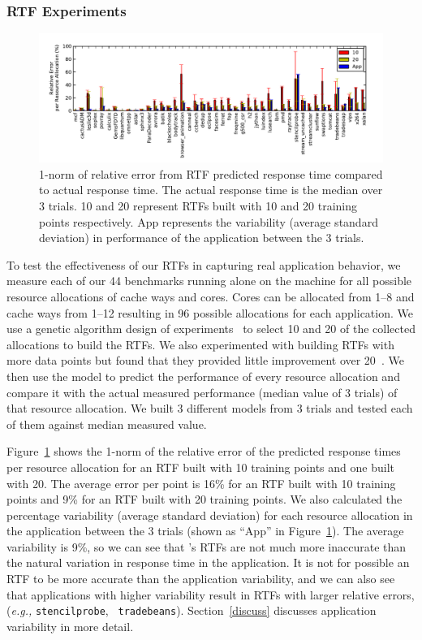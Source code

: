 \subsubsection{RTF Experiments}
\begin{figure}[!t]
	\begin{center}	
		\includegraphics[bb=0 0 576 216,width=\textwidth]{Figures/model_accuracy.pdf}
		\caption{1-norm of relative error from RTF predicted response time compared to actual response time.  The actual response time is the median over 3 trials. 10 and 20 represent RTFs built with 10 and 20 training points respectively.  App represents the variability (average standard deviation) in performance of the application between the 3 trials.}
		\label{model_accuracy}
	\end{center}
\end{figure}
To test the effectiveness of our RTFs in capturing real application behavior, we measure each of our 44 benchmarks running alone on the machine for all possible resource allocations of cache ways and cores.  Cores can be allocated from 1--8 and cache ways from 1--12 resulting in 96 possible allocations for each application.   We use a genetic algorithm design of experiments~\cite{bates-aes03} to select 10 and 20 of the collected allocations to build the RTFs.  We also experimented with building RTFs with more data points but found that they provided little improvement over 20~\cite{pacora_tr}.  We then use the model to predict the performance of every resource allocation and compare it with the actual measured performance (median value of 3 trials) of that resource allocation.  We built 3 different models from 3 trials and tested each of them against median measured value.

Figure~\ref{model_accuracy} shows the 1-norm of the relative error of the predicted response times per resource allocation for an RTF built with 10 training points and one built with 20.  The average error per point is 16\% for an RTF built with 10 training points and 9\% for an RTF built with 20 training points.  We also calculated the percentage variability (average standard deviation) for each resource allocation in the application between the 3 trials (shown as ``App'' in Figure~\ref{model_accuracy}).  The average variability is 9\%, so we can see that \pacora's RTFs are not much more inaccurate than the natural variation in response time in the application.  It is not for possible an RTF to be more accurate than the application variability, and we can also see that applications with higher variability result in RTFs with larger relative errors, (\emph{e.g.,} \texttt{stencilprobe}, \texttt{ tradebeans}).  Section~\ref{discuss} discusses application variability in more detail.

